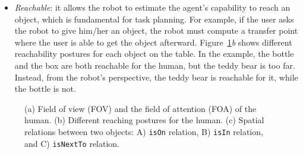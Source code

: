 \documentclass{svmult}
\newcommand{\concept}[1]{{\footnotesize \texttt{#1}}}
\begin{document}
\begin{itemize}
\item \emph{Reachable}: it allows the robot to estimate the agent's capability
to reach an object, which is fundamental for task planning. For example, if the
user asks the robot to give him/her an object, the robot must compute a transfer
point where the user is able to get the object afterward. 
Figure~\ref{fig::sparkRepresentations}\emph{b} shows different reachability postures for each object
on the table. In the example, the bottle and the box are both reachable for the
human, but the teddy bear is too far. Instead, from the robot's perspective,
the teddy bear is reachable for it, while the bottle is not.


\end{itemize}

\begin{figure}[!t]
	 \quad
	\qquad	
	
	\caption{(a) Field of view (FOV) and the field of attention (FOA) of the human. (b) Different reaching postures for the human. (c) Spatial relations between two objects: A) \concept{isOn} relation, B) \concept{isIn} relation, and C) \concept{isNextTo} relation.}
	\label{fig::sparkRepresentations}
\end{figure} 
\end{document}
